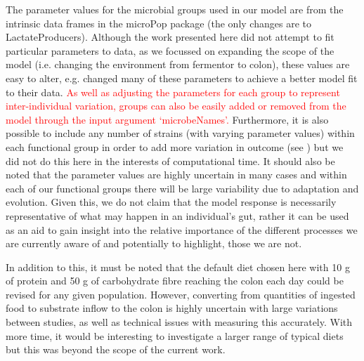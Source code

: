 \documentclass[a4paper]{article}
\begin{document}
The parameter values for the microbial groups used in our model are from the intrinsic data frames in the microPop package (the only changes are to LactateProducers). 
Although the work presented here did not attempt to fit particular parameters to data, as we focussed on expanding the scope of the model (i.e. changing the environment from fermentor to colon), these values are easy to alter, e.g. \cite{wang} changed many of these parameters to achieve a better model fit to their data.
\textcolor{red}{As well as adjusting the parameters for each group to represent inter-individual variation, groups can also be easily added or removed from the model through the input argument `microbeNames'.}
Furthermore, it is also possible to include any number of strains (with varying parameter values) within each functional group in order to add more variation in outcome (see \cite{Kettle2015}) but we did not do this here in the interests of computational time.
It should also be noted that the parameter values are highly uncertain in many cases and within each of our functional groups there will be large variability due to adaptation and evolution. 
Given this, we do not claim that the model response is necessarily representative of what may happen in an individual's gut, rather it can be used as an aid to gain insight into the relative importance of the different processes we are currently aware of and potentially to highlight, those we are not. 

In addition to this, it must be noted that the default diet chosen here with 10 g of protein and 50 g of carbohydrate fibre reaching the colon each day could be revised for any given population.
However, converting from quantities of ingested food to substrate inflow to the colon is highly uncertain with large variations between studies, as well as technical issues with measuring this accurately. 
With more time, it would be interesting to investigate a larger range of typical diets but this was beyond the scope of the current work.
\end{document}
